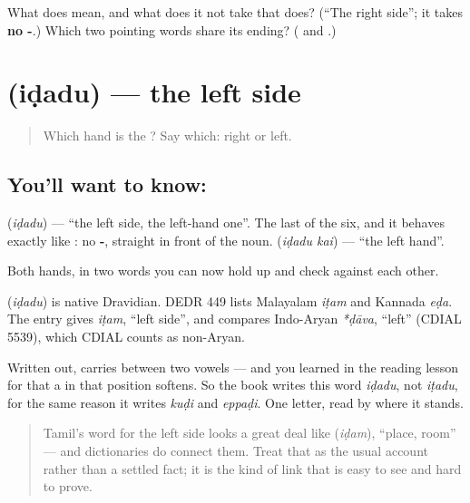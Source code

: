 \begin{tcolorbox}[breakable,colback=teal!4,colframe=teal!35!black,title={Before you move on}]
What does  mean, and what does it not take that  does? (\textquotedblleft{}The right side\textquotedblright{}; it takes \textbf{no -}.) Which two pointing words share its ending? (\textbf{} and \textbf{}.)
\end{tcolorbox}
\section[\texorpdfstring{\ta{இடது} (iḍadu)}{இடது (iḍadu)}]{ (iḍadu) — the left side}

\label{lesson:TA-C66-left}



\begin{quote}
Which hand is the \textbf{ }? Say which: right or left.
\end{quote}

\subsection*{You'll want to know: }
\textbf{} (\emph{iḍadu}) — \textquotedblleft{}the left side, the left-hand one\textquotedblright{}. The last of the six, and it behaves exactly like : no \textbf{-}, straight in front of the noun. \textbf{ } (\emph{iḍadu kai}) — \textquotedblleft{}the left hand\textquotedblright{}.

Both hands, in two words you can now hold up and check against each other.

\begin{cousinweb}
\textbf{} (\emph{iḍadu}) is native Dravidian. DEDR 449 lists Malayalam \emph{iṭam} and Kannada \emph{eḍa}. The entry gives \emph{iṭam}, \textquotedblleft{}left side\textquotedblright{}, and compares Indo-Aryan \emph{*ḍāva}, \textquotedblleft{}left\textquotedblright{} (CDIAL 5539), which CDIAL counts as non-Aryan.
\end{cousinweb}

\begin{culture}
Written out, \textbf{} carries \textbf{} between two vowels — and you learned in the reading lesson for \textbf{} that a \textbf{} in that position softens. So the book writes this word \emph{iḍadu}, not \emph{iṭadu}, for the same reason it writes \emph{kuḍi} and \emph{eppaḍi}. One letter, read by where it stands.

\begin{quote}
Tamil's word for the left side looks a great deal like \textbf{} (\emph{iḍam}), \textquotedblleft{}place, room\textquotedblright{} — and dictionaries do connect them. Treat that as the usual account rather than a settled fact; it is the kind of link that is easy to see and hard to prove.
\end{quote}
\end{culture}


